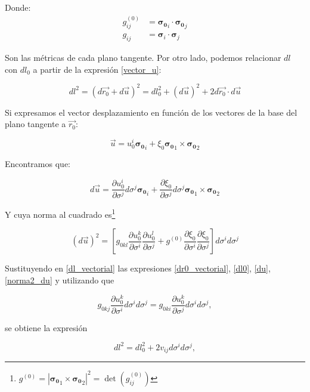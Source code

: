 Donde:
\begin{align*}
g^{(0)}_{ij}&=\boldsymbol{\sigma_0}_i\cdot\boldsymbol{\sigma_0}_j\\
g_{ij}&=\boldsymbol{\sigma}_i\cdot\boldsymbol{\sigma}_j
\end{align*}

Son las métricas de cada plano tangente. Por otro lado, podemos relacionar
$dl$ con $dl_0$ a partir de la expresión 
\eqref{vector_u}:

\begin{equation}\label{dl_vectorial}
dl^2=(d\vec{r_0}+d\vec{u})^2=dl^2_0+(d\vec{u})^2+2d\vec{r_0}\cdot d\vec{u}
\end{equation}


Si expresamos el vector desplazamiento en función de los vectores de la
base del plano tangente a $\vec{r_0}$:

\begin{equation*}
\vec{u}=u^i_0\boldsymbol{\sigma_0}_i+\xi_{0} \boldsymbol{\sigma_0}_1\times \boldsymbol{\sigma_0}_2
\end{equation*}

Encontramos que: 

\begin{equation}\label{du}
d\vec{u}=\frac{\partial u_0^i}{\partial\sigma^j}d\sigma^j\boldsymbol{\sigma_0}_i+\frac{\partial\xi_0}{\partial \sigma^j}d\sigma^j \boldsymbol{\sigma_0}_1\times \boldsymbol{\sigma_0}_2
\end{equation}

Y cuya norma al cuadrado es\footnote{$g^{(0)}=|\boldsymbol{\sigma_0}_1\times \boldsymbol{\sigma_0}_2|^2=\det(g^{(0)}_{ij})$}

\begin{equation}\label{norma2_du}
(d\vec{u})^2=\left[g_{0kl}
\frac{\partial u_0^k}{\partial\sigma^i}
\frac{\partial u_0^l}{\partial\sigma^j}+ 
g^{(0)}\frac{\partial \xi_0}{\partial \sigma^i}
\frac{\partial \xi_0}{\partial \sigma^j}\right]
d\sigma^id\sigma^j 
\end{equation}

Sustituyendo en \eqref{dl_vectorial} las expresiones \eqref{dr0_vectorial}, \eqref{dl0}, \eqref{du},
\eqref{norma2_du} y utilizando que

 $$g_{0kj}\frac{\partial u^k_0}{\partial
   \sigma^i}d\sigma^id\sigma^j=g_{0ki}\frac{\partial u^k_0}{\partial
   \sigma^j}d\sigma^id\sigma^j,$$

se obtiene la expresión

\begin{equation*}
dl^2=dl^2_0+2v_{ij}d\sigma^id\sigma^j,
\end{equation*}

